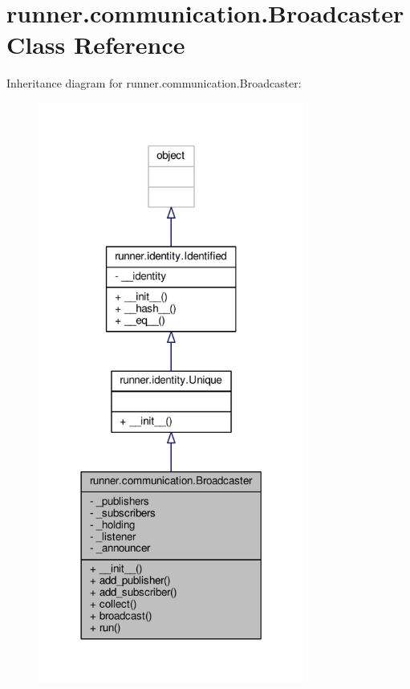 \hypertarget{classrunner_1_1communication_1_1Broadcaster}{}\section{runner.\+communication.\+Broadcaster Class Reference}
\label{classrunner_1_1communication_1_1Broadcaster}


Inheritance diagram for runner.\+communication.\+Broadcaster\+:
\nopagebreak
\begin{figure}[H]
\begin{center}
\leavevmode
\includegraphics[width=248pt]{classrunner_1_1communication_1_1Broadcaster__inherit__graph}
\end{center}
\end{figure}



